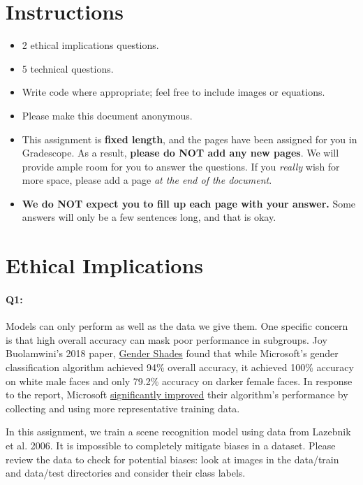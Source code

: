 \maketitle
\thispagestyle{fancy}
\vspace{-3cm}

\section*{Instructions}
\begin{itemize}
  \item 2 ethical implications questions.
  \item 5 technical questions.
  \item Write code where appropriate; feel free to include images or equations.
  \item Please make this document anonymous.
  \item This assignment is \textbf{fixed length}, and the pages have been assigned for you in Gradescope. As a result, \textbf{please do NOT add any new pages}. We will provide ample room for you to answer the questions. If you \emph{really} wish for more space, please add a page \emph{at the end of the document}.
  \item \textbf{We do NOT expect you to fill up each page with your answer.} Some answers will only be a few sentences long, and that is okay.
\end{itemize}
\pagebreak
\section*{Ethical Implications}
\paragraph{Q1:} Models can only perform as well as the data we give them. One specific concern is that high overall accuracy can mask poor performance in subgroups. Joy Buolamwini's 2018 paper, \href{http://gendershades.org/overview.html}{Gender Shades} found that while Microsoft's gender classification algorithm achieved 94\% overall accuracy, it achieved 100\% accuracy on white male faces and only 79.2\% accuracy on darker female faces. In response to the report, Microsoft \href{https://blogs.microsoft.com/ai/gender-skin-tone-facial-recognition-improvement/}{significantly improved} their algorithm's performance by collecting and using more representative training data.  
 
In this assignment, we train a scene recognition model using data from Lazebnik et al. 2006. It is impossible to completely mitigate biases in a dataset. Please review the data to check for potential biases: look at images in the data/train and data/test directories and consider their class labels.

